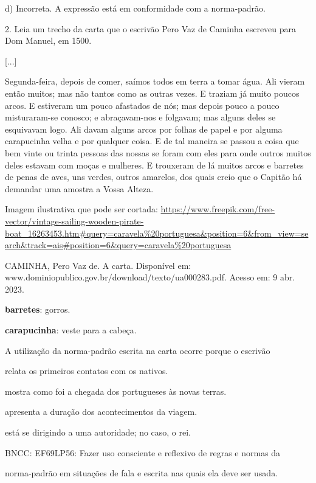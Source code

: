 d) Incorreta. A expressão está em conformidade com a norma-padrão.

2. Leia um trecho da carta que o escrivão Pero Vaz de Caminha escreveu
para Dom Manuel, em 1500.

{[}...{]}

Segunda-feira, depois de comer, saímos todos em terra a tomar água. Ali
vieram então muitos; mas não tantos como as outras vezes. E traziam já
muito poucos arcos. E estiveram um pouco afastados de nós; mas depois
pouco a pouco misturaram-se conosco; e abraçavam-nos e folgavam; mas
alguns deles se esquivavam logo. Ali davam alguns arcos por folhas de
papel e por alguma carapucinha velha e por qualquer coisa. E de tal
maneira se passou a coisa que bem vinte ou trinta pessoas das nossas se
foram com eles para onde outros muitos deles estavam com moças e
mulheres. E trouxeram de lá muitos arcos e barretes de penas de aves,
uns verdes, outros amarelos, dos quais creio que o Capitão há demandar
uma amostra a Vossa Alteza.

Imagem ilustrativa que pode ser cortada:
\url{https://www.freepik.com/free-vector/vintage-sailing-wooden-pirate-boat_16263453.htm\#query=caravela\%20portuguesa\&position=6\&from_view=search\&track=ais\#position=6\&query=caravela\%20portuguesa}

CAMINHA, Pero Vaz de. A carta. Disponível em:
www.dominiopublico.gov.br/download/texto/ua000283.pdf. Acesso em: 9 abr.
2023.

\textbf{barretes}: gorros.

\textbf{carapucinha}: veste para a cabeça.

A utilização da norma-padrão escrita na carta ocorre porque o escrivão

\begin{escolha}
\item relata os primeiros contatos com os nativos.

\item mostra como foi a chegada dos portugueses às novas terras.

\item apresenta a duração dos acontecimentos da viagem.

\item está se dirigindo a uma autoridade; no caso, o rei.

\end{escolha}BNCC: EF69LP56: Fazer uso consciente e reflexivo de regras e normas da

norma-padrão em situações de fala e escrita nas quais ela deve ser
usada.

